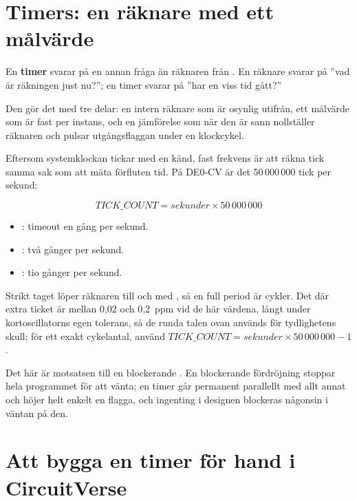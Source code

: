 
\section{Timers: en räknare med ett målvärde}
\label{c7:sec:concept}

En \textbf{timer} svarar på en annan fråga än räknaren från . En räknare
svarar på ”vad är räkningen just nu?”; en timer svarar på ”har en viss tid gått?”

Den gör det med tre delar: en intern räknare som är osynlig utifrån, ett målvärde
 som är fast per instans, och en jämförelse som när den är sann nollställer
räknaren och pulsar utgångsflaggan  under en klockcykel.

Eftersom systemklockan tickar med en känd, fast frekvens är att räkna tick samma sak som att mäta
förfluten tid. På DE0-CV är det 50\,000\,000 tick per sekund:

\[ \mathit{TICK\_COUNT} = \mathit{sekunder} \times 50\,000\,000 \]

\begin{itemize}
  \item {}: timeout en gång per sekund.
  \item {}: två gånger per sekund.
  \item {}: tio gånger per sekund.
\end{itemize}

Strikt taget löper räknaren  till och med , så en full period är
 cykler. Det där extra ticket är mellan 0,02 och 0,2~ppm vid de här värdena,
långt under kortoscillatorns egen tolerans, så de runda talen ovan används för tydlighetens skull;
för ett exakt cykelantal, använd
$\mathit{TICK\_COUNT} = \mathit{sekunder} \times 50\,000\,000 - 1$.

Det här är motsatsen till en blockerande . En blockerande fördröjning stoppar hela
programmet för att vänta; en timer går permanent parallellt med allt annat och höjer helt enkelt en
flagga, och ingenting i designen blockeras någonsin i väntan på den.

\section{Att bygga en timer för hand i CircuitVerse}
\label{c7:sec:byhand}

